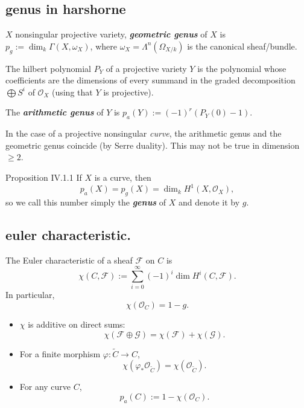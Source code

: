 \subsection*{genus in harshorne}
\begin{defn}\leavevmode
\(X\) nonsingular projective variety, \textit{\textbf{geometric genus}} of \(X\) is \(p_g:=\dim_k\Gamma(X,\omega_X)\), where \(\omega_X=\Lambda^{n}(\Omega_{X/k})\) is the canonical sheaf/bundle.
\end{defn}

\begin{defn}[p. 54]\leavevmode
The hilbert polynomial \(P_Y\) of a projective variety  \(Y\) is the polynomial whose coefficients are the dimensions of every summand in the graded decomposition \(\bigoplus S^i\) of \(\mathcal{O}_X\) (using that \(Y\) is projective).

The \textit{\textbf{arithmetic genus}} of \(Y\) is \(p_a(Y):=(-1)^{r}(P_Y(0)-1).\)
\end{defn}

\begin{remark}\leavevmode
	In the case of a projective nonsingular \textit{curve}, the arithmetic genus and the geometric genus coincide (by Serre duality). This may not be true in dimension \(\geq 2\).
\end{remark}

\begin{thing4}{Proposition IV.1.1}\label{prop:IV.1.1}\leavevmode
If \(X\) is a curve, then
\[p_a(X)=p_g(X)=\dim_kH^{1}(X,\mathcal{O}_X),\]
so we call this number simply the \textit{\textbf{genus}} of \(X\) and denote it by \(g\).
\end{thing4}




\subsection{euler characteristic.}
The Euler characteristic of a sheaf \( \mathcal{F} \) on \( C \) is
\[
\chi(C, \mathcal{F}) := \sum_{i=0}^\infty (-1)^i \dim H^i(C, \mathcal{F}).
\]
In particular,
\[
\chi(\mathcal{O}_C) = 1 - g.
\]
\begin{itemize}
  \item \(\chi\) is additive on direct sums:
  \[
  \chi(\mathcal{F} \oplus \mathcal{G}) = \chi(\mathcal{F}) + \chi(\mathcal{G}).
  \]
  \item For a finite morphism \( \varphi: \widetilde{C} \to C \),
  \[
  \chi(\varphi_*\mathcal{O}_{\widetilde{C}}) = \chi(\mathcal{O}_{\widetilde{C}}).
  \]
  \item For any curve \( C \),
  \[
  p_a(C) := 1 - \chi(\mathcal{O}_C).
  \]
\end{itemize}

